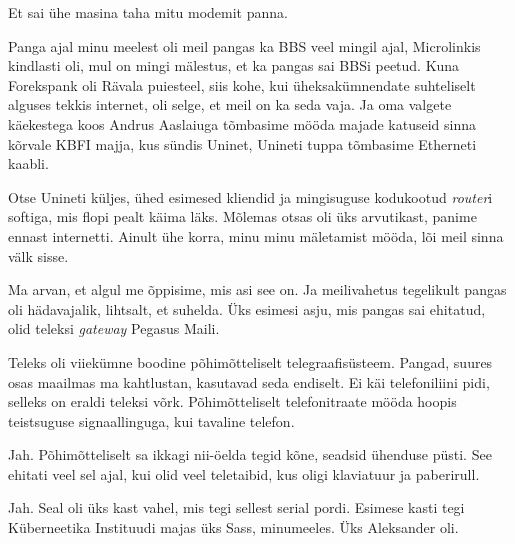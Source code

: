 
Et sai ühe masina taha  mitu modemit panna.


Panga ajal minu meelest oli meil pangas ka BBS veel mingil ajal, Microlinkis kindlasti oli, mul on mingi mälestus, et ka pangas sai BBSi peetud. Kuna Forekspank oli Rävala puiesteel, siis  kohe, kui üheksakümnendate suhteliselt alguses tekkis internet, oli selge, et meil on ka seda vaja. Ja oma valgete käekestega koos Andrus Aaslaiuga tõmbasime mööda majade katuseid sinna kõrvale KBFI majja, kus sündis Uninet, Unineti tuppa tõmbasime Etherneti kaabli.

Otse Unineti küljes, ühed esimesed kliendid ja mingisuguse kodukootud \emph{router}i softiga, mis flopi pealt käima läks. Mõlemas otsas oli üks arvutikast, panime ennast internetti. Ainult ühe korra, minu minu mäletamist mööda, lõi meil sinna välk sisse.


Ma arvan, et algul me õppisime, mis asi see on. Ja meilivahetus tegelikult pangas oli hädavajalik, lihtsalt, et  suhelda. Üks esimesi asju, mis pangas sai ehitatud, olid teleksi \emph{gateway} Pegasus Maili. 


Teleks oli viiekümne boodine põhimõtteliselt telegraafisüsteem. Pangad, suures osas maailmas ma kahtlustan, kasutavad seda endiselt. Ei käi telefoniliini pidi, selleks on eraldi teleksi võrk. Põhimõtteliselt telefonitraate mööda hoopis teistsuguse signaallinguga,  kui tavaline telefon.


Jah. Põhimõtteliselt sa ikkagi  nii-öelda tegid kõne, seadsid ühenduse püsti. See ehitati veel sel ajal, kui olid veel  teletaibid, kus oligi klaviatuur ja paberirull.


Jah. Seal oli üks kast vahel, mis tegi sellest serial pordi. Esimese kasti tegi Küberneetika Instituudi majas üks Sass, minumeeles. Üks Aleksander oli.

